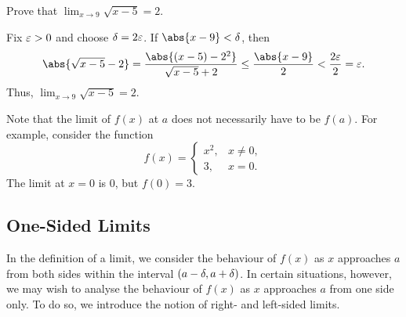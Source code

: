 \begin{figure}[H]
\centering
{}
\caption{}
\end{figure}

\begin{sample}
    Prove that $\lim_{x \to 9} \sqrt{x-5} = 2$.
\end{sample}
\begin{sampans}
    Fix $\varepsilon > 0$ and choose $\delta = 2\varepsilon$. If $\abs{x - 9} < \de$, then \[\abs{\sqrt{x-5} - 2} = \frac{\abs{(x - 5) - 2^2}}{\sqrt{x-5} + 2} \leq \frac{\abs{x-9}}{2} < \frac{2\ve}{2} = \ve.\] Thus, $\lim_{x \to 9} \sqrt{x-5} = 2$.
\end{sampans}

Note that the limit of $f(x)$ at $a$ does not necessarily have to be $f(a)$. For example, consider the function \[f(x) = \begin{cases}x^2, & x \neq 0, \\ 3, & x = 0.\end{cases}\] The limit at $x = 0$ is 0, but $f(0) = 3$.

\subsection{One-Sided Limits}

In the definition of a limit, we consider the behaviour of $f(x)$ as $x$ approaches $a$ from both sides within the interval $(a-\delta, a+\delta)$. In certain situations, however, we may wish to analyse the behaviour of $f(x)$ as $x$ approaches $a$ from one side only. To do so, we introduce the notion of right- and left-sided limits.

